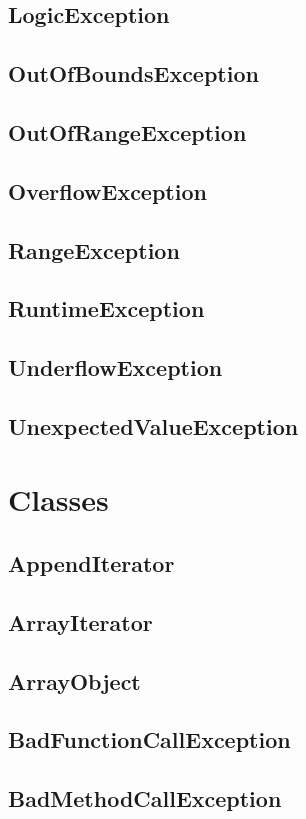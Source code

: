 \section{LogicException}
\section{OutOfBoundsException}
\section{OutOfRangeException}
\section{OverflowException}
\section{RangeException}
\section{RuntimeException}
\section{UnderflowException}
\section{UnexpectedValueException}


\chapter{Classes}

\section{AppendIterator}
\section{ArrayIterator}
\section{ArrayObject}
\section{BadFunctionCallException}
\section{BadMethodCallException}
